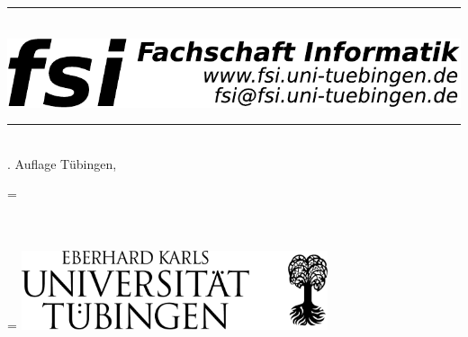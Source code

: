 \thispagestyle{empty}
\rule[2mm]{\textwidth}{.2cm}\\
\includegraphics[width=\textwidth]{logos/fsilogo}

\rule{\textwidth}{0.2cm}\\
{\sf \number\auflage. Auf\/lage \hfill Tübingen, \Month\space \number\jahr}\\

\vspace*{2cm}
\begin{center}
\oldbaselineskp=\baselineskip
\baselineskip 45pt

\Huge \name\\[2cm]


\LARGE \Month \space \number\jahr
\\

\baselineskip=\oldbaselineskp
\vfill
\includegraphics[width=9cm]{logos/unilogo_neu}
\end{center}
\eject